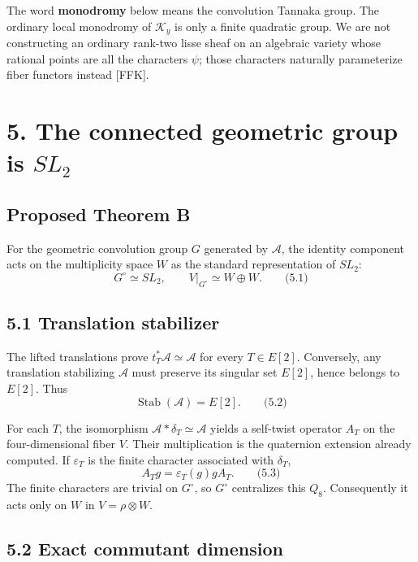 \documentclass[
  11pt,
  a4paper,
]{article}
\begin{document}
The word \textbf{monodromy} below means the convolution Tannaka group.
The ordinary local monodromy of \(\mathcal K_y\) is only a finite
quadratic group. We are not constructing an ordinary rank-two lisse
sheaf on an algebraic variety whose rational points are all the
characters \(\psi\); those characters naturally parameterize fiber
functors instead {[}FFK{]}.

\section{\texorpdfstring{5. The connected geometric group is
\(SL_2\)}{5. The connected geometric group is SL\_2}}\label{the-connected-geometric-group-is-sl_2}

\subsection{Proposed Theorem B}\label{proposed-theorem-b}

For the geometric convolution group \(G\) generated by \(\mathcal A\),
the identity component acts on the multiplicity space \(W\) as the
standard representation of \(SL_2\): \[
G^\circ\simeq SL_2,\qquad V\vert_{G^\circ}\simeq W\oplus W.
\qquad \text{(5.1)}
\]

\subsection{5.1 Translation stabilizer}\label{translation-stabilizer}

The lifted translations prove \(t_T^*\mathcal A\simeq\mathcal A\) for
every \(T\in E[2]\). Conversely, any translation stabilizing
\(\mathcal A\) must preserve its singular set \(E[2]\), hence belongs to
\(E[2]\). Thus \[
\operatorname{Stab}(\mathcal A)=E[2].
\qquad \text{(5.2)}
\]

For each \(T\), the isomorphism \(\mathcal A*\delta_T\simeq\mathcal A\)
yields a self-twist operator \(A_T\) on the four-dimensional fiber
\(V\). Their multiplication is the quaternion extension already
computed. If \(\varepsilon_T\) is the finite character associated with
\(\delta_T\), \[
A_Tg=\varepsilon_T(g)gA_T.
\qquad \text{(5.3)}
\] The finite characters are trivial on \(G^\circ\), so \(G^\circ\)
centralizes this \(Q_8\). Consequently it acts only on \(W\) in
\(V=\rho\otimes W\).

\subsection{5.2 Exact commutant
dimension}\label{exact-commutant-dimension}
\end{document}
